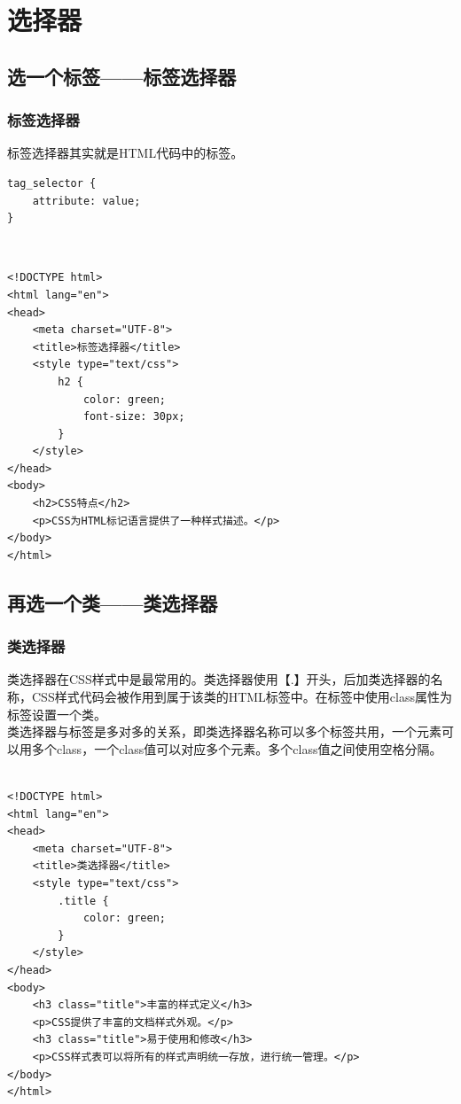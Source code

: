 \newpage

\chapter{选择器}

\section{选一个标签——标签选择器}

\subsection{标签选择器}

标签选择器其实就是HTML代码中的标签。 \\

\begin{lstlisting}[style=htmlcssjs]
tag_selector {
    attribute: value;
}
\end{lstlisting}

 \\
\begin{lstlisting}[style=htmlcssjs]
<!DOCTYPE html>
<html lang="en">
<head>
    <meta charset="UTF-8">
    <title>标签选择器</title>
    <style type="text/css">
        h2 {
            color: green;
            font-size: 30px;
        }
    </style>
</head>
<body>
    <h2>CSS特点</h2>
    <p>CSS为HTML标记语言提供了一种样式描述。</p>
</body>
</html>
\end{lstlisting}

\newpage

\section{再选一个类——类选择器}

\subsection{类选择器}

类选择器在CSS样式中是最常用的。类选择器使用【.】开头，后加类选择器的名称，CSS样式代码会被作用到属于该类的HTML标签中。在标签中使用class属性为标签设置一个类。 \\

类选择器与标签是多对多的关系，即类选择器名称可以多个标签共用，一个元素可以用多个class，一个class值可以对应多个元素。多个class值之间使用空格分隔。 \\

 \\
\begin{lstlisting}[style=htmlcssjs]
<!DOCTYPE html>
<html lang="en">
<head>
    <meta charset="UTF-8">
    <title>类选择器</title>
    <style type="text/css">
        .title {
            color: green;
        }
    </style>
</head>
<body>
    <h3 class="title">丰富的样式定义</h3>
    <p>CSS提供了丰富的文档样式外观。</p>
    <h3 class="title">易于使用和修改</h3>
    <p>CSS样式表可以将所有的样式声明统一存放，进行统一管理。</p>
</body>
</html>
\end{lstlisting}

